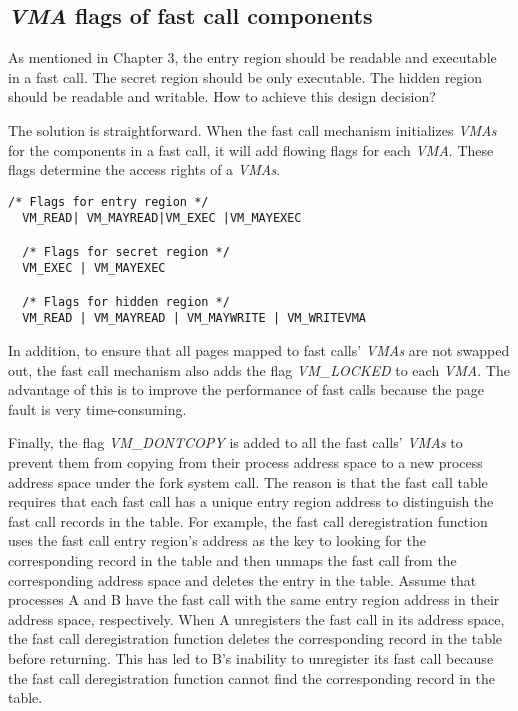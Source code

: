 \subsection{\emph{VMA} flags of fast call components}
As mentioned in Chapter 3, the entry region should be readable and executable in a fast call. 
The secret region should be only executable. The hidden region should be readable and writable. 
How to achieve this design decision?

The solution is straightforward. When the fast call mechanism initializes 
\emph{VMAs} for the components in a fast call, it will add flowing flags for 
each \emph{VMA}. These flags determine the access rights of a \emph{VMAs}.

\begin{lstlisting}[style=CStyle]
  /* Flags for entry region */
  VM_READ| VM_MAYREAD|VM_EXEC |VM_MAYEXEC

  /* Flags for secret region */
  VM_EXEC | VM_MAYEXEC

  /* Flags for hidden region */
  VM_READ | VM_MAYREAD | VM_MAYWRITE | VM_WRITEVMA
\end{lstlisting}


In addition, to ensure that all pages mapped to fast calls' \emph{VMAs} 
are not swapped out, the fast call mechanism also adds the flag \emph{VM\_LOCKED} 
to each \emph{VMA}. The advantage of this is to improve the performance of 
fast calls because the page fault is very time-consuming.

Finally, the flag \emph{VM\_DONTCOPY} is added to all the fast calls' \emph{VMAs} to prevent 
them from copying from their process address space to a new process address space 
under the fork system call. The reason is that the fast call table requires that each 
fast call has a unique entry region address to distinguish the fast call records in 
the table. For example, the fast call deregistration function uses the fast call entry 
region's address as the key to looking for the corresponding record in the table and then 
unmaps the fast call from the corresponding address space and deletes the entry in the table. 
Assume that processes A and B have the fast call with the same entry region address in their 
address space, respectively. When A unregisters the fast call in its address space, 
the fast call deregistration function deletes the corresponding record in the table 
before returning. This has led to B's inability to unregister its fast call because 
the fast call deregistration function cannot find the corresponding record in the table.


